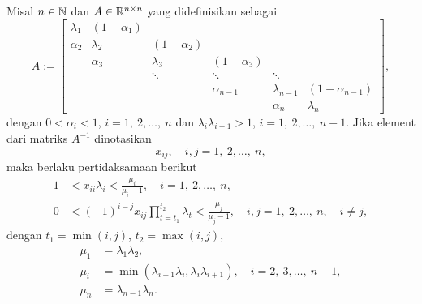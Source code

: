 \begin{lemma}\label{3.4.1}
    Misal $n\in \mathbb{N}$ dan $A \in \mathbb{R}^{n\times n}$ yang didefinisikan sebagai
    \begin{equation*}
        A:=
        \begin{bmatrix}
            \lambda_1 & (1-\alpha_1) \\
             \alpha_2 & \lambda_2 & (1-\alpha_2) \\
            & \alpha_3 & \lambda_3 & (1-\alpha_3) \\
            && \ddots & \ddots & \ddots \\
            &&& \alpha_{n-1} & \lambda_{n-1} & (1-\alpha_{n-1}) \\
            &&&& \alpha_{n} & \lambda_{n}
        \end{bmatrix},
    \end{equation*}
    dengan $0<\alpha_i<1$, $i=1,~2,\dots,~n$ dan $\lambda_i \lambda_{i+1}>1$, $i=1,~2,\dots,~n-1$.
    Jika element dari matriks $A^{-1}$ dinotasikan
    \begin{equation*}
        x_{ij}, \quad i,j=1,~2,\dots,~n, 
    \end{equation*}
    maka berlaku pertidaksamaan berikut
    \begin{align*}
        1 &< x_{ii}\lambda_i < \frac{\mu_{i}}{\mu_i - 1}, \quad i=1,~2,\dots,~n,\\
        0 &<(-1)^{i-j}x_{ij} \prod_{t=t_1}^{t_2}{\lambda_t}<\frac{\mu_{j}}{\mu_j - 1}, \quad i,j=1,~2,\dots,~n, \quad i \neq j,
    \end{align*}
    dengan $t_1=\min(i,j)$, $t_2=\max(i,j)$,
    \begin{align*}
        \mu_1&=\lambda_1 \lambda_2,\\
        \mu_i&=\min(\lambda_{i-1} \lambda_i, \lambda_i \lambda_{i+1}), \quad i=2,~3,\dots,~n-1,\\
        \mu_n&=\lambda_{n-1}\lambda_n.
    \end{align*}
\end{lemma}


